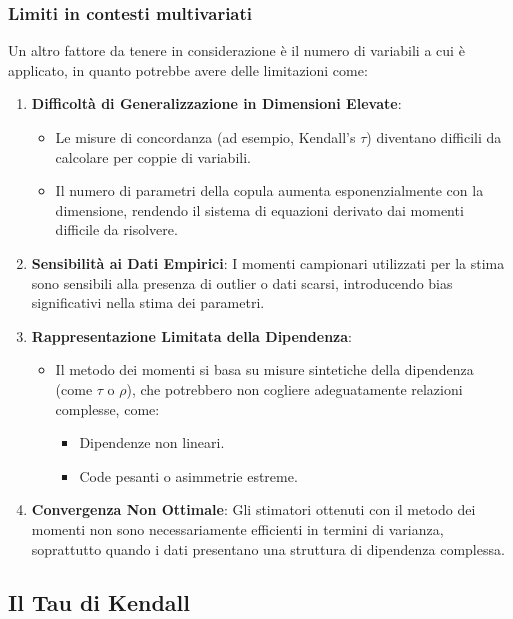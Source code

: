 \documentclass[%
	corpo=11pt,
    twoside,
    stile=classica,
    oldstyle,
    tipotesi=custom,
    greek,
    evenboxes,
]{toptesi}
\begin{document}
\subsubsection{Limiti in contesti multivariati}

Un altro fattore da tenere in considerazione è il numero di variabili a cui è applicato, in quanto potrebbe avere delle limitazioni come:

\begin{enumerate}
	\item \textbf{Difficoltà di Generalizzazione in Dimensioni Elevate}: 
	\begin{itemize}
		\item Le misure di concordanza (ad esempio, Kendall’s \( \tau \)) diventano difficili da calcolare per coppie di variabili.
		\item Il numero di parametri della copula aumenta esponenzialmente con la dimensione, rendendo il sistema di equazioni derivato dai momenti difficile da risolvere.
	\end{itemize}
	
	\item \textbf{Sensibilità ai Dati Empirici}: I momenti campionari utilizzati per la stima sono sensibili alla presenza di outlier o dati scarsi, introducendo bias significativi nella stima dei parametri.
	
	\item \textbf{Rappresentazione Limitata della Dipendenza}:
	\begin{itemize}
		\item Il metodo dei momenti si basa su misure sintetiche della dipendenza (come \( \tau \) o \( \rho \)), che potrebbero non cogliere adeguatamente relazioni complesse, come:
		\begin{itemize}
			\item Dipendenze non lineari.
			\item Code pesanti o asimmetrie estreme.
		\end{itemize}
	\end{itemize}
	
	\item \textbf{Convergenza Non Ottimale}: Gli stimatori ottenuti con il metodo dei momenti non sono necessariamente efficienti in termini di varianza, soprattutto quando i dati presentano una struttura di dipendenza complessa.
\end{enumerate}

\newpage

\subsection{Il Tau di Kendall}
\end{document}
